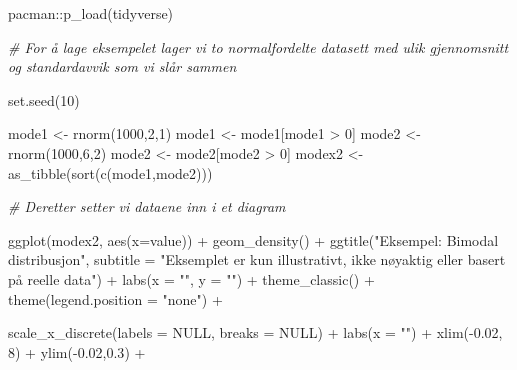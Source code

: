 \documentclass[
]{book}
\newenvironment{Shaded}{\begin{snugshade}}{\end{snugshade}}
\newcommand{\AttributeTok}[1]{\textcolor[rgb]{0.77,0.63,0.00}{#1}}
\newcommand{\CommentTok}[1]{\textcolor[rgb]{0.56,0.35,0.01}{\textit{#1}}}
\newcommand{\ConstantTok}[1]{\textcolor[rgb]{0.00,0.00,0.00}{#1}}
\newcommand{\DecValTok}[1]{\textcolor[rgb]{0.00,0.00,0.81}{#1}}
\newcommand{\FloatTok}[1]{\textcolor[rgb]{0.00,0.00,0.81}{#1}}
\newcommand{\FunctionTok}[1]{\textcolor[rgb]{0.00,0.00,0.00}{#1}}
\newcommand{\NormalTok}[1]{#1}
\newcommand{\OtherTok}[1]{\textcolor[rgb]{0.56,0.35,0.01}{#1}}
\newcommand{\SpecialCharTok}[1]{\textcolor[rgb]{0.00,0.00,0.00}{#1}}
\newcommand{\StringTok}[1]{\textcolor[rgb]{0.31,0.60,0.02}{#1}}
\begin{document}
\begin{Shaded}
\begin{Highlighting}[]
\NormalTok{pacman}\SpecialCharTok{::}\FunctionTok{p\_load}\NormalTok{(tidyverse)}

\CommentTok{\# For å lage eksempelet lager vi to normalfordelte datasett med ulik gjennomsnitt og standardavvik som vi slår sammen}

\FunctionTok{set.seed}\NormalTok{(}\DecValTok{10}\NormalTok{) }

\NormalTok{mode1 }\OtherTok{\textless{}{-}} \FunctionTok{rnorm}\NormalTok{(}\DecValTok{1000}\NormalTok{,}\DecValTok{2}\NormalTok{,}\DecValTok{1}\NormalTok{)}
\NormalTok{mode1 }\OtherTok{\textless{}{-}}\NormalTok{ mode1[mode1 }\SpecialCharTok{\textgreater{}} \DecValTok{0}\NormalTok{] }
\NormalTok{mode2 }\OtherTok{\textless{}{-}} \FunctionTok{rnorm}\NormalTok{(}\DecValTok{1000}\NormalTok{,}\DecValTok{6}\NormalTok{,}\DecValTok{2}\NormalTok{)}
\NormalTok{mode2 }\OtherTok{\textless{}{-}}\NormalTok{ mode2[mode2 }\SpecialCharTok{\textgreater{}} \DecValTok{0}\NormalTok{] }
\NormalTok{modex2 }\OtherTok{\textless{}{-}} \FunctionTok{as\_tibble}\NormalTok{(}\FunctionTok{sort}\NormalTok{(}\FunctionTok{c}\NormalTok{(mode1,mode2)))}

\CommentTok{\# Deretter setter vi dataene inn i et diagram}

\FunctionTok{ggplot}\NormalTok{(modex2, }\FunctionTok{aes}\NormalTok{(}\AttributeTok{x=}\NormalTok{value)) }\SpecialCharTok{+} 
  \FunctionTok{geom\_density}\NormalTok{() }\SpecialCharTok{+}
  \FunctionTok{ggtitle}\NormalTok{(}\StringTok{"Eksempel: Bimodal distribusjon"}\NormalTok{, }\AttributeTok{subtitle =} \StringTok{"Eksemplet er kun illustrativt, ikke nøyaktig eller basert på reelle data"}\NormalTok{) }\SpecialCharTok{+}
  \FunctionTok{labs}\NormalTok{(}\AttributeTok{x =} \StringTok{""}\NormalTok{, }\AttributeTok{y =} \StringTok{""}\NormalTok{) }\SpecialCharTok{+}
  \FunctionTok{theme\_classic}\NormalTok{() }\SpecialCharTok{+}
  \FunctionTok{theme}\NormalTok{(}\AttributeTok{legend.position =} \StringTok{"none"}\NormalTok{) }\SpecialCharTok{+} 
  
  \FunctionTok{scale\_x\_discrete}\NormalTok{(}\AttributeTok{labels =} \ConstantTok{NULL}\NormalTok{, }\AttributeTok{breaks =} \ConstantTok{NULL}\NormalTok{) }\SpecialCharTok{+}
  \FunctionTok{labs}\NormalTok{(}\AttributeTok{x =} \StringTok{""}\NormalTok{) }\SpecialCharTok{+}
  \FunctionTok{xlim}\NormalTok{(}\SpecialCharTok{{-}}\FloatTok{0.02}\NormalTok{, }\DecValTok{8}\NormalTok{) }\SpecialCharTok{+}
  \FunctionTok{ylim}\NormalTok{(}\SpecialCharTok{{-}}\FloatTok{0.02}\NormalTok{,}\FloatTok{0.3}\NormalTok{) }\SpecialCharTok{+}
 

\end{Highlighting}
\end{Shaded}
\end{document}
